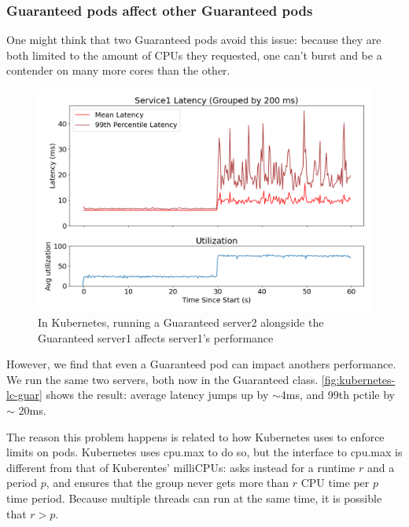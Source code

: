 \subsubsection{Guaranteed pods affect other Guaranteed pods}

One might think that two Guaranteed pods avoid this issue: because they are both
limited to the amount of CPUs they requested, one can't burst and be a contender
on many more cores than the other.

\begin{figure}[t]
    \centering
    \includegraphics[width=\columnwidth]{graphs/kubernetes-lc-guar.png}
    \caption{In Kubernetes, running a Guaranteed server2 alongside the
    Guaranteed server1 affects server1's
    performance}\label{fig:kubernetes-lc-guar}
\end{figure}

However, we find that even a Guaranteed pod can impact anothers performance. We
run the same two servers, both now in the Guaranteed class.
\autoref{fig:kubernetes-lc-guar} shows the result: average latency jumps up by
$\sim$4ms, and 99th pctile by $\sim$ 20ms.

The reason this problem happens is related to how Kubernetes uses \cgroups{} to
enforce limits on pods. Kubernetes uses cpu.max to do so, but the interface to
\cgroups{} cpu.max is different from that of Kuberentes' milliCPUs: \cgroups{}
asks instead for a runtime $r$ and a period $p$, and ensures that the group
never gets more than $r$ CPU time per $p$ time period. Because multiple threads
can run at the same time, it is possible that $r>p$.

